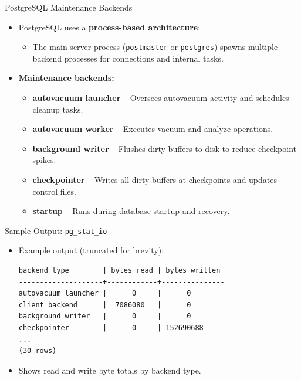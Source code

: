 \documentclass[aspectratio=169]{beamer}
\begin{document}
\begin{frame}{PostgreSQL Maintenance Backends}
\begin{itemize}
    \item PostgreSQL uses a \textbf{process-based architecture}:
    \begin{itemize}
        \item The main server process (\texttt{postmaster} or \texttt{postgres}) spawns multiple backend processes for connections and internal tasks.
    \end{itemize}
    \item \textbf{Maintenance backends:}
    \begin{itemize}
        \item \textbf{autovacuum launcher} – Oversees autovacuum activity and schedules cleanup tasks.
        \item \textbf{autovacuum worker} – Executes vacuum and analyze operations.
        \item \textbf{background writer} – Flushes dirty buffers to disk to reduce checkpoint spikes.
        \item \textbf{checkpointer} – Writes all dirty buffers at checkpoints and updates control files.
        \item \textbf{startup} – Runs during database startup and recovery.
    \end{itemize}
\end{itemize}
\end{frame}


\begin{frame}[fragile]{Sample Output: \texttt{pg\_stat\_io}}
\begin{itemize}
    \item Example output (truncated for brevity):
\begin{verbatim}
backend_type        | bytes_read | bytes_written
--------------------+------------+---------------
autovacuum launcher |      0     |      0
client backend      |  7086080   |      0
background writer   |      0     |      0
checkpointer        |      0     | 152690688
...
(30 rows)
\end{verbatim}
    \item Shows read and write byte totals by backend type.
\end{itemize}
\end{frame}
\end{document}
